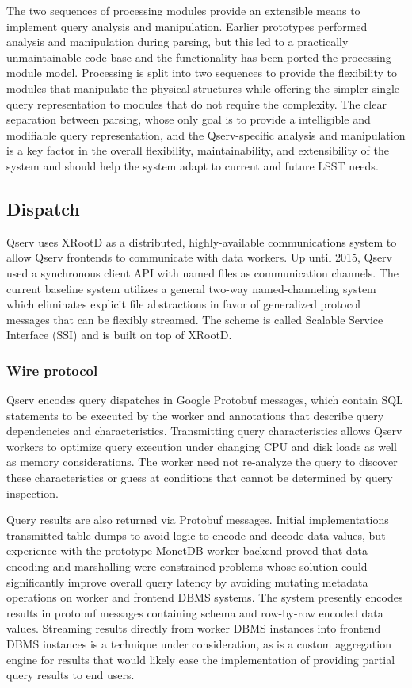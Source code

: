 \documentclass[DM,toc]{lsstdoc}
\begin{document}
The two sequences of processing modules provide an extensible means to
implement query analysis and manipulation. Earlier prototypes performed
analysis and manipulation during parsing, but this led to a practically
unmaintainable code base and the functionality has been ported the
processing module model. Processing is split into two sequences to
provide the flexibility to modules that manipulate the physical
structures while offering the simpler single-query representation to
modules that do not require the complexity. The clear separation between
parsing, whose only goal is to provide a intelligible and modifiable
query representation, and the Qserv-specific analysis and manipulation
is a key factor in the overall flexibility, maintainability, and
extensibility of the system and should help the system adapt to current
and future LSST needs.

\subsection{Dispatch}\label{dispatch}

Qserv uses XRootD as a distributed, highly-available communications system to
allow Qserv frontends to communicate with data workers. Up until 2015, Qserv
used a synchronous client API with named files as communication channels. The
current baseline system utilizes a general two-way named-channeling system
which eliminates explicit file abstractions in favor of generalized protocol
messages that can be flexibly streamed. The scheme is called Scalable Service
Interface (SSI) and is built on top of XRootD.

\subsubsection{Wire protocol}\label{wire-protocol}

Qserv encodes query dispatches in Google Protobuf messages, which contain SQL
statements to be executed by the worker and annotations that describe query
dependencies and characteristics. Transmitting query characteristics allows
Qserv workers to optimize query execution under changing CPU and disk loads as
well as memory considerations. The worker need not re-analyze the query to
discover these characteristics or guess at conditions that cannot be
determined by query inspection.

Query results are also returned via Protobuf messages. Initial implementations
transmitted table dumps to avoid logic to encode and decode data values, but
experience with the prototype MonetDB worker backend proved that data encoding
and marshalling were constrained problems whose solution could significantly
improve overall query latency by avoiding mutating metadata operations on
worker and frontend DBMS systems.  The system presently encodes results in
protobuf messages containing schema and row-by-row encoded data values.
Streaming results directly from worker DBMS instances into frontend DBMS
instances is a technique under consideration, as is a custom aggregation
engine for results that would likely ease the implementation of providing
partial query results to end users.
\end{document}
